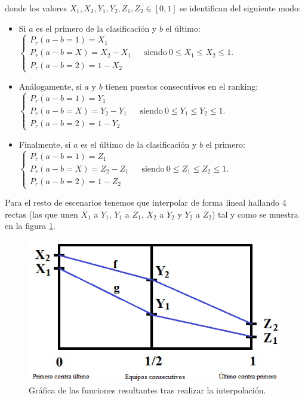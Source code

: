 donde los valores $X_{1},X_{2},Y_{1},Y_{2},Z_{1},Z_{2} \in [0,1]$ se identifican del siguiente modo:
\begin{itemize}
	\item Si $a$ es el primero de la clasificación y $b$ el último:\\	 
	 $\begin{cases}
	 	P_{r}(a-b=1)=X_{1}\\
	 	P_{r}(a-b=X)=X_{2}-X_{1} \ \ \ \ \ \ \ \text{siendo} \ 0 \leq X_{1} \leq X_{2} \leq 1.\\
	 	P_{r}(a-b=2)=1-X_{2} 
	 \end{cases}$\\
	\item Análogamente, si $a$ y $b$ tienen puestos consecutivos en el ranking:\\
	$\begin{cases}
	P_{r}(a-b=1)=Y_{1}\\
	P_{r}(a-b=X)=Y_{2}-Y_{1} \ \ \ \ \ \ \ \text{siendo} \ 0 \leq Y_{1} \leq Y_{2} \leq 1.\\
	P_{r}(a-b=2)=1-Y_{2} 
	\end{cases}$\\
	\item Finalmente, si $a$ es el último de la clasificación y $b$ el primero:\\
	$\begin{cases}
	P_{r}(a-b=1)=Z_{1}\\
	P_{r}(a-b=X)=Z_{2}-Z_{1} \ \ \ \ \ \ \ \text{siendo} \ 0 \leq Z_{1} \leq Z_{2} \leq 1.\\
	P_{r}(a-b=2)=1-Z_{2} 
	\end{cases}$
\end{itemize}

Para el resto de escenarios tenemos que interpolar de forma lineal hallando 4 rectas (las que unen $X_{1}$ a $Y_{1}$, $Y_{1}$ a $Z_{1}$, $X_{2}$ a $Y_{2}$ y $Y_{2}$ a $Z_{2}$) tal y como se muestra en la figura \ref{fig:interpolar}.

\begin{figure}[htb]
	\centering
	\includegraphics[scale=0.7]{images/interpolar.png}
	\caption{Gráfica de las funciones resultantes tras realizar la interpolación.} \label{fig:interpolar}
\end{figure}

